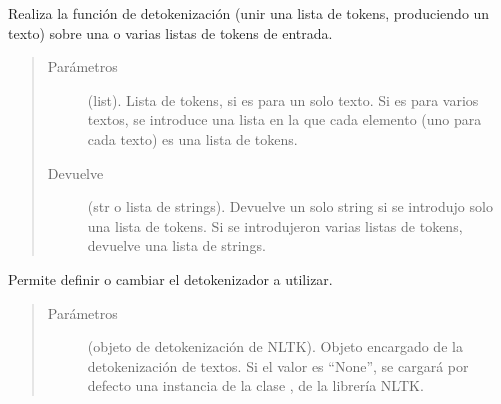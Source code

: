 \documentclass[letterpaper,10pt,openany,spanish]{sphinxmanual}
\begin{document}
\begin{fulllineitems}
\begin{fulllineitems}
\label{\detokenize{funciones/utils:utils.tokenizacion.TokenizadorNLTK.destokenizar}}
Realiza la función de detokenización (unir una lista de tokens, produciendo un texto) sobre             una o varias listas de tokens de entrada.
\begin{quote}\begin{description}
\item[{Parámetros}] \leavevmode
{} \textendash{} (list). Lista de tokens, si es para un solo texto. Si es para varios         textos, se introduce una lista en la que cada elemento (uno para cada texto) es una         lista de tokens.

\item[{Devuelve}] \leavevmode
(str o lista de strings). Devuelve un solo string si se introdujo solo una lista de tokens.             Si se introdujeron varias listas de tokens, devuelve una lista de strings.

\end{description}\end{quote}

\end{fulllineitems}


\begin{fulllineitems}
\label{\detokenize{funciones/utils:utils.tokenizacion.TokenizadorNLTK.establecer_destokenizador}}
Permite definir o cambiar el detokenizador a utilizar.
\begin{quote}\begin{description}
\item[{Parámetros}] \leavevmode
{} \textendash{} (objeto de detokenización de NLTK). Objeto             encargado de la detokenización de textos. Si el valor es “None”, se cargará por             defecto una instancia de la clase , de la librería NLTK.

\end{description}\end{quote}


\end{fulllineitems}
\end{fulllineitems}
\end{document}
